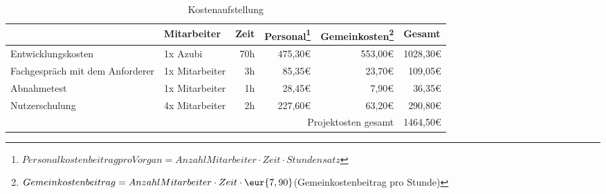 \begin{table}[h]
\begin{minipage}{\textwidth}
\begin{tabular}{llrrrr}
\rowcolor{gragreen}\multicolumn{1}{l}{\bf{Vorgang}} & \multicolumn{1}{l}{\bf{Mitarbeiter}} & \multicolumn{1}{l}{\bf{Zeit}} & \multicolumn{1}{l}{\bf{Personal\footnote{$Personalkostenbeitrag pro Vorgan = Anzahl Mitarbeiter \cdot Zeit \cdot Stundensatz $}}} & \multicolumn{1}{l}{\bf{Gemeinkosten\footnote{$Gemeinkostenbeitrag = Anzahl Mitarbeiter \cdot Zeit \cdot \eur{7,90} $(Gemeinkostenbeitrag pro Stunde)}}} & \multicolumn{1}{l}{\bf{Gesamt}} \\
\hline
\rowcolor{odd}Entwicklungskosten & 1x Azubi       & 70h & 475,30€  &  553,00€ & 1028,30€ \\
Fachgespräch mit dem Anforderer  & 1x Mitarbeiter & 3h  &  85,35€  &   23,70€ &  109,05€ \\
\rowcolor{odd}Abnahmetest        & 1x Mitarbeiter & 1h  &  28,45€  &    7,90€ &   36,35€ \\
Nutzerschulung                   & 4x Mitarbeiter & 2h  & 227,60€  &   63,20€ &  290,80€ \\
\hline
\rowcolor{heading}& & & \multicolumn{2}{r}{Projektosten gesamt} & 1464,50€ \\
\end{tabular}
\caption{Kostenaufstellung}
\label{table:kostenaufstellung}
\end{minipage}
\end{table}